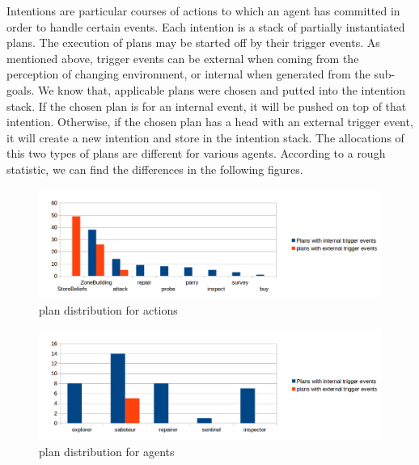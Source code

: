 Intentions are particular courses of actions to which an agent has committed in order to handle certain events. Each intention is a stack of partially instantiated plans\cite{rafael_Javabased_2007}. The execution of plans may be started off by their trigger events. As mentioned above, trigger events can be external when coming from the perception of changing environment, or internal when generated from the sub-goals. We know that, applicable plans were chosen and putted into the intention stack. If the chosen plan is for an internal event, it will be pushed on top of that intention. Otherwise, if the chosen plan has a head with an external trigger event, it will create a new intention and store in the intention stack. The allocations of this two types of plans are different for various agents. According to a rough statistic, we can find the differences in the following figures.
\begin{figure}
\centering
\begin{minipage}[!htbp]{\linewidth}
\includegraphics[width=5.0in]{images/BDI_plan_distribution_action}
\caption{plan distribution for actions}
\label{fig:plan_allocation}
\end{minipage}
\end{figure}
\begin{figure}
\centering
\begin{minipage}[!htbp]{\linewidth}
\includegraphics[width=5.0in]{images/BDI_plan_distribution_role}
\caption{plan distribution for agents}
\label{fig:baselinex}
\end{minipage}
\end{figure}
 
